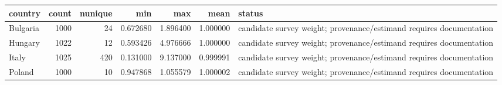 \begin{tabular}{lrrrrrl}
\toprule
country & count & nunique & min & max & mean & status \\
\midrule
Bulgaria & 1000 & 24 & 0.672680 & 1.896400 & 1.000000 & candidate survey weight; provenance/estimand requires documentation \\
Hungary & 1022 & 12 & 0.593426 & 4.976666 & 1.000000 & candidate survey weight; provenance/estimand requires documentation \\
Italy & 1025 & 420 & 0.131000 & 9.137000 & 0.999991 & candidate survey weight; provenance/estimand requires documentation \\
Poland & 1000 & 10 & 0.947868 & 1.055579 & 1.000002 & candidate survey weight; provenance/estimand requires documentation \\
\bottomrule
\end{tabular}
